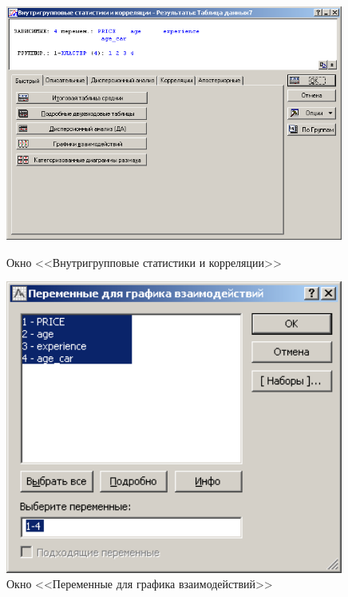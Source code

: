 \begin{figure}[!h]
  \centering
  \begin{minipage}{0.49\textwidth}
    \centering

    \includegraphics[width=0.99\textwidth]
    {inc/cars_my/3.12.PNG}

    \caption{Окно <<Внутригрупповые статистики и корреляции>>}
    \label{fig:3_12}
  \end{minipage}
  \begin{minipage}{0.49\textwidth}
    \centering

    \includegraphics[width=0.99\textwidth]
    {inc/cars_my/3.13.PNG}

    \caption{Окно <<Переменные для графика взаимодействий>>}
    \label{fig:3_13}
  \end{minipage}
\end{figure}

